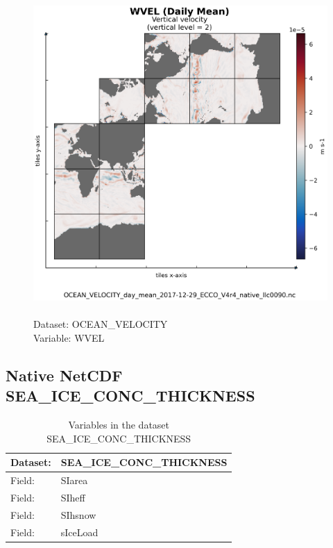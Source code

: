 \begin{figure}[H]
\centering
\includegraphics[scale=0.5]{../images/plots/native_plots/Ocean_Velocity/WVEL.png}
\caption{\\Dataset: OCEAN\_VELOCITY\\Variable: WVEL}
\label{tab:table-OCEAN_VELOCITY_WVEL-Plot}
\end{figure}
\pagebreak
\subsection{Native NetCDF SEA\_ICE\_CONC\_THICKNESS}
\newp
\begin{longtable}{|p{}|p{}|}
\caption{Variables in the dataset SEA\_ICE\_CONC\_THICKNESS}
\label{tab:table-SEA_ICE_CONC_THICKNESS-fields} \\ 
\hline \endhead \hline \endfoot
\rowcolor{lightgray} \textbf{Dataset:} & \textbf{SEA\_ICE\_CONC\_THICKNESS} \\ \hline
Field: &SIarea \\ \hline
Field: &SIheff \\ \hline
Field: &SIhsnow \\ \hline
Field: &sIceLoad \\ \hline
\end{longtable}

\pagebreak
